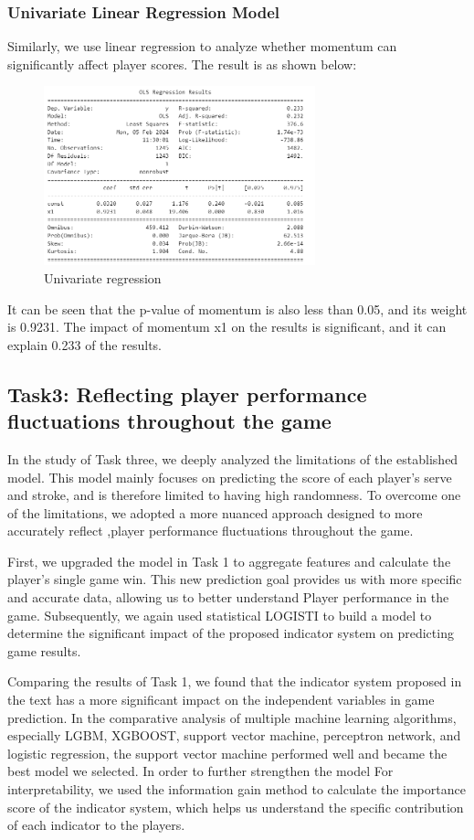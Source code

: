 \documentclass[12pt]{article}
\begin{document}
\subsubsection{Univariate Linear Regression Model}
Similarly, we use linear regression to analyze whether momentum can significantly affect player scores. The result is as shown below:
\begin{figure}[H]
      \centering
      \includegraphics[width=0.7\textwidth]{Univariate_linear_regression.png}
      \caption{Univariate regression}
\end{figure}
It can be seen that the p-value of momentum is also less than 0.05, and its weight is 0.9231. The impact of momentum x1 on the results is significant, and it can explain 0.233 of the results.

\subsection{Task3: Reflecting player performance fluctuations throughout the game}
In the study of Task three, we deeply analyzed the limitations of the established model. This model mainly focuses on predicting the score of each player's serve and stroke, and is therefore limited to having high randomness. To overcome one of the limitations, we adopted a more nuanced approach designed to more accurately reflect ,player performance fluctuations throughout the game.

First, we upgraded the model in Task 1 to aggregate features and calculate the player's single game win. This new prediction goal provides us with more specific and accurate data, allowing us to better understand Player performance in the game. Subsequently, we again used statistical LOGISTI to build a model to determine the significant impact of the proposed indicator system on predicting game results.

Comparing the results of Task 1, we found that the indicator system proposed in the text has a more significant impact on the independent variables in game prediction. In the comparative analysis of multiple machine learning algorithms, especially LGBM, XGBOOST, support vector machine, perceptron network, and logistic regression, the support vector machine performed well and became the best model we selected. In order to further strengthen the model For interpretability, we used the information gain method to calculate the importance score of the indicator system, which helps us understand the specific contribution of each indicator to the players.
\end{document}
